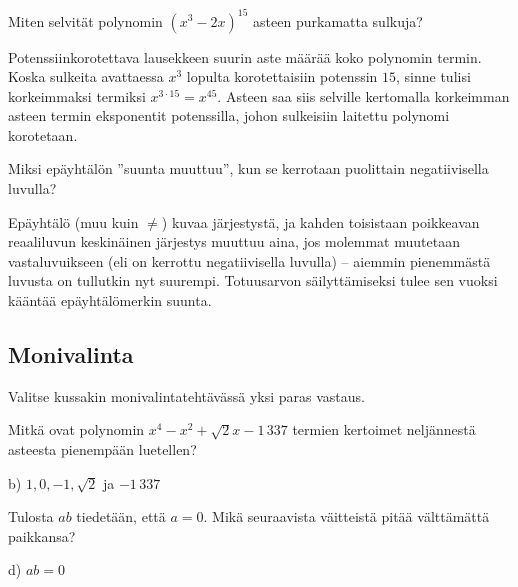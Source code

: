 \begin{tehtava}
Miten selvität polynomin $(x^3-2x)^{15}$ asteen purkamatta sulkuja?
	\begin{vastaus}
Potenssiinkorotettava lausekkeen suurin aste määrää koko polynomin termin. Koska sulkeita avattaessa $x^3$ lopulta korotettaisiin potenssin $15$, sinne tulisi korkeimmaksi termiksi $x^{3\cdot 15}=x^{45}$. Asteen saa siis selville kertomalla korkeimman asteen termin eksponentit potenssilla, johon sulkeisiin laitettu polynomi korotetaan.
	\end{vastaus}
\end{tehtava}

\begin{tehtava}
Miksi epäyhtälön ''suunta muuttuu'', kun se kerrotaan puolittain negatiivisella luvulla?
	\begin{vastaus}
Epäyhtälö (muu kuin $\neq$) kuvaa järjestystä, ja kahden toisistaan poikkeavan reaaliluvun keskinäinen järjestys muuttuu aina, jos molemmat muutetaan vastaluvuikseen (eli on kerrottu negatiivisella luvulla) -- aiemmin pienemmästä luvusta on tullutkin nyt suurempi. Totuusarvon säilyttämiseksi tulee sen vuoksi kääntää epäyhtälömerkin suunta.
	\end{vastaus}
\end{tehtava}

\subsection*{Monivalinta}

Valitse kussakin monivalintatehtävässä yksi paras vastaus.

\begin{tehtava}
Mitkä ovat polynomin $x^4-x^2+\sqrt{2}x-1\,337$ termien kertoimet neljännestä asteesta pienempään luetellen?
	\begin{alakohdat}
	\end{alakohdat}
	\begin{vastaus}
	b) $1, 0, -1, \sqrt{2}$ ja $-1\,337$
	\end{vastaus}
\end{tehtava}

\begin{tehtava}
Tulosta $ab$ tiedetään, että $a = 0$. Mikä seuraavista väitteistä pitää välttämättä paikkansa?
		\begin{alakohdat}
		\alakohta{$b \geq a$}
		\alakohta{$b = 0$}
		\alakohta{$|b| \geq a$}
		\alakohta{$ab = 0$}
		\end{alakohdat}
		\begin{vastaus}
d) $ab = 0$
	\end{vastaus}
\end{tehtava}

